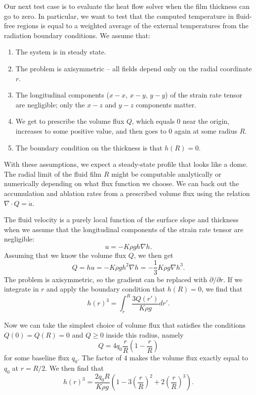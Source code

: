 \documentclass{article}
\theoremstyle{definition}
\theoremstyle{plain}
\begin{document}
Our next test case is to evaluate the heat flow solver when the film thickness can go to zero.
In particular, we want to test that the computed temperature in fluid-free regions is equal to a weighted average of the external temperatures from the radiation boundary conditions.
We assume that:
\begin{enumerate}
    \item The system is in steady state.
    \item The problem is axisymmetric -- all fields depend only on the radial coordinate $r$.
    \item The longitudinal components ($x-x$, $x-y$, $y-y$) of the strain rate tensor are negligible; only the $x-z$ and $y-z$ components matter.
    \item We get to prescribe the volume flux $Q$, which equals 0 near the origin, increases to some positive value, and then goes to 0 again at some radius $R$.
    \item The boundary condition on the thickness is that $h(R) = 0$.
\end{enumerate}
With these assumptions, we expect a steady-state profile that looks like a dome.
The radial limit of the fluid film $R$ might be computable analytically or numerically depending on what flux function we choose.
We can back out the accumulation and ablation rates from a prescribed volume flux using the relation $\nabla\cdot Q = \dot a$.

The fluid velocity is a purely local function of the surface slope and thickness when we assume that the longitudinal components of the strain rate tensor are negligible:
\begin{equation}
    u = -K\rho gh\nabla h.
\end{equation}
Assuming that we know the volume flux $Q$, we then get
\begin{equation}
    Q = hu = -K\rho gh^2\nabla h = -\frac{1}{3}K\rho g\nabla h^3.
\end{equation}
The problem is axisymmetric, so the gradient can be replaced with $\partial/\partial r$.
If we integrate in $r$ and apply the boundary condition that $h(R) = 0$, we find that
\begin{equation}
    h(r)^3 = \int_r^R\frac{3Q(r')}{K\rho g}dr'.
\end{equation}

Now we can take the simplest choice of volume flux that satisfies the conditions $Q(0) = Q(R) = 0$ and $Q \ge 0$ inside this radius, namely
\begin{equation}
    Q = 4q_0\frac{r}{R}\left(1 - \frac{r}{R}\right)
\end{equation}
for some baseline flux $q_0$.
The factor of 4 makes the volume flux exactly equal to $q_0$ at $r = R / 2$.
We then find that
\begin{equation}
    h(r)^3 = \frac{2q_0R}{K\rho g}\left(1 - 3\left(\frac{r}{R}\right)^2 + 2\left(\frac{r}{R}\right)^3\right).
\end{equation}
\end{document}
